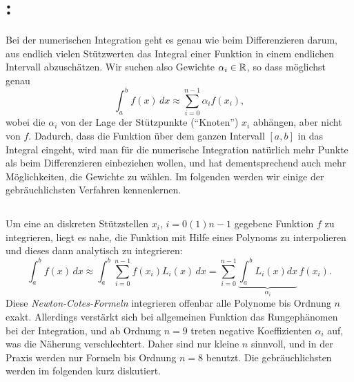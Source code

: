 \afterpage{\raggedbottom
  
  \clearpage
}

\section{: }

Bei der numerischen Integration geht es genau wie beim Differenzieren
darum, aus endlich vielen Stützwerten das Integral einer Funktion in
einem endlichen Intervall abzuschätzen. Wir suchen also Gewichte
$\alpha_{i}\in\mathbb{R}$, so dass möglichst genau
\begin{equation}
  \int_a^b f(x)\, dx \approx \sum_{i=0}^{n-1} \alpha_if(x_i),
\end{equation}
wobei die $\alpha_i$ von der Lage der Stützpunkte ("`Knoten"') $x_i$
abhängen, aber nicht von $f$. Dadurch, dass die Funktion über dem
ganzen Intervall $[a,b]$ in das Integral eingeht, wird man für die
numerische Integration natürlich mehr Punkte als beim Differenzieren
einbeziehen wollen, und hat dementsprechend auch mehr Möglichkeiten,
die Gewichte zu wählen. Im folgenden werden wir einige der
gebräuchlichsten Verfahren kennenlernen.

\subsection{}

Um eine an diskreten Stützstellen $x_i$, $i=0(1)n-1$ gegebene Funktion
$f$ zu integrieren, liegt es nahe, die Funktion mit Hilfe eines
Polynoms zu interpolieren und dieses dann analytisch zu integrieren:
\begin{equation}
  \int_a^b f(x)\, dx \approx
  \int_a^b \sum_{i=0}^{n-1} f(x_i) L_i(x) \, dx = \sum_{i=0}^{n-1}
  \underbrace{\int_a^b
  L_i(x) dx}_{\alpha_i}\, f(x_i).
\end{equation}
Diese \emph{Newton-Cotes-Formeln} integrieren offenbar alle Polynome
bis Ordnung $n$ exakt. Allerdings verstärkt sich bei allgemeinen
Funktion das Rungephänomen bei der Integration, und ab Ordnung $n=9$
treten negative Koeffizienten $\alpha_i$ auf, was die Näherung
verschlechtert. Daher sind nur kleine $n$ sinnvoll, und in der Praxis
werden nur Formeln bis Ordnung $n=8$ benutzt. Die
gebräuchlichsten werden im folgenden kurz diskutiert.

